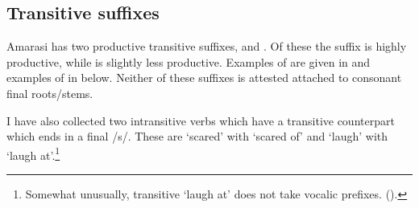 \subsection{Transitive suffixes}\label{sec:TraSuf}
Amarasi has two productive transitive suffixes,  and .
Of these the suffix  is highly productive,
while  is slightly less productive.
Examples of  are given in 
and examples of  in  below.
Neither of these suffixes is attested attached to consonant final roots/stems.

\begin{exe}
	\label{ex:TraSuf-b}
\end{exe}

\begin{exe}
	\label{ex:TraSuf-q}
\end{exe}

I have also collected two intransitive verbs which
have a transitive counterpart which ends in a final /s/.
These are  `scared' with  `scared of'
and  `laugh' with  `laugh at'.\footnote{
		Somewhat unusually, transitive  `laugh at'
		does not take vocalic prefixes. ().}

